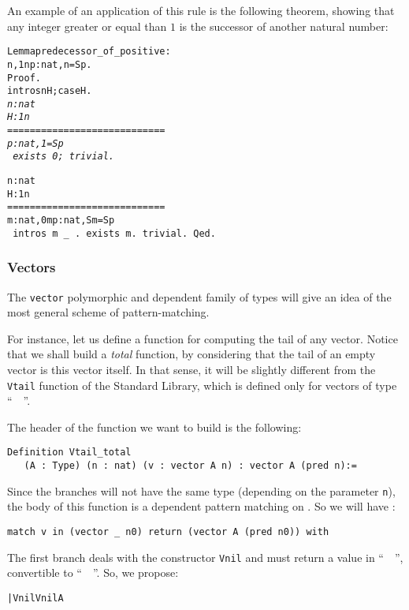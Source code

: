 \documentclass[11pt]{article}
\begin{document}
An example of an application of this rule is the following theorem,
showing that any integer greater or equal than $1$ is the successor of another
natural number:

\begin{alltt}
Lemma predecessor_of_positive : 
 {\prodsym} n, 1 {\coqle} n {\arrow} {\exsym} p:nat, n = S p.
Proof.
 intros n H;case H.
\it
  n : nat
  H : 1 {\coqle} n
  ============================
   {\exsym} p : nat, 1 = S p
\tt
  exists 0; trivial.
\it

  n : nat
  H : 1 {\coqle} n
  ============================
   {\prodsym} m : nat, 0 {\coqle} m {\arrow} {\exsym} p : nat, S m = S p
\tt
  intros m _  .
  exists m.
  trivial.
Qed.
\end{alltt}


\subsubsection{Vectors}

The \texttt{vector} polymorphic and dependent family of types will
give an idea of the most general scheme of pattern-matching.

For instance, let us define a function for computing the tail of
any vector. Notice that we shall build a \emph{total} function,
by considering that the tail of an empty vector is this vector itself.
In that sense, it will be slightly different from the \texttt{Vtail}
function of the Standard Library, which is defined only for vectors
of type ``~~''.

The header of the function we want to build is the following:

\begin{verbatim}
Definition Vtail_total 
   (A : Type) (n : nat) (v : vector A n) : vector A (pred n):=
\end{verbatim}

Since the branches will not have the same type
(depending on the parameter \texttt{n}),
the body of this function is a dependent pattern matching on 
.
So we will have :
\begin{verbatim}
match v in (vector _ n0) return (vector A (pred n0)) with
\end{verbatim}

The first branch  deals with the constructor \texttt{Vnil} and must
return a value in ``~~'', convertible
to ``~~''. So, we propose:
\begin{alltt}
| Vnil {\funarrow} Vnil A
\end{alltt}
\end{document}
